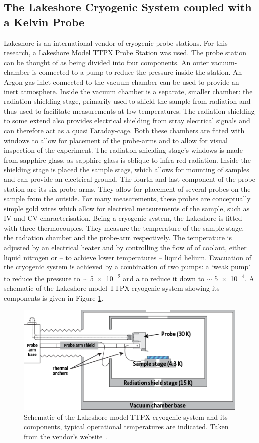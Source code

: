 \subsection{The Lakeshore Cryogenic System coupled with a \McA{} Kelvin Probe}
\label{sec:kpnew}
Lakeshore is an international vendor of cryogenic probe stations. For this research, a Lakeshore Model TTPX Probe Station was used. The probe station can be thought of as being divided into four components. An outer vacuum-chamber is connected to a pump to reduce the pressure inside the station. An Argon gas inlet connected to the vacuum chamber can be used to provide an inert atmosphere. Inside the vacuum chamber is a separate, smaller chamber: the radiation shielding stage, primarily used to shield the sample from \ir{} radiation and thus used to facilitate measurements at low temperatures. The radiation shielding to some extend also provides electrical shielding from stray electrical signals and can therefore act as a quasi Faraday-cage. Both these chambers are fitted with windows to allow for placement of the probe-arms and to allow for visual inspection of the experiment. The radiation shielding stage's windows is made from sapphire glass, as sapphire glass is oblique to infra-red radiation. Inside the shielding stage is placed the sample stage, which allows for mounting of samples and can provide an electrical ground. The fourth and last component of the probe station are its six probe-arms. They allow for placement of several probes on the sample from the outside. For many measurements, these probes are conceptually simple gold wires which allow for electrical measurements of the sample, such as IV and CV characterisation. Being a cryogenic system, the Lakeshore is fitted with three thermocouples. They measure the temperature of the sample stage, the radiation chamber and the probe-arm respectively. The temperature is adjusted by an electrical heater and by controlling the flow of of coolant, either liquid nitrogen or -- to achieve lower temperatures -- liquid helium. Evacuation of the cryogenic system is achieved by a combination of two pumps: a `weak pump' to reduce the pressure to $\sim$ \num{5e-2} and a  to reduce it down to $\sim$ \num{5e-4}. A schematic of the Lakeshore model TTPX cryogenic system showing its components is given in Figure \ref{fig:McAscheme}.\\
\begin{figure}
\centering
	\includegraphics[width=0.8\linewidth]{./figs/chap2/Config_TTPX}
	\caption{Schematic of the Lakeshore model TTPX cryogenic system and its components, typical operational temperatures are indicated. Taken from the vendor's website~\cite{lakeshore}.}
	\label{fig:McAscheme}
\end{figure}
